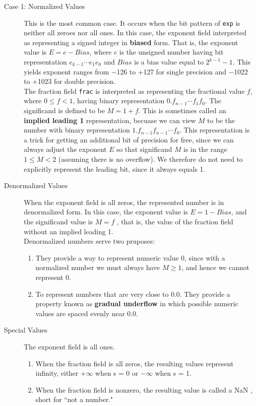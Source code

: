 \documentclass[11pt]{article}
\begin{document}
\begin{description}
\item[{Case 1: Normalized Values}] This is the most common case. It occurs when the bit pattern of \texttt{exp} is neither all zeroes nor all ones. In this case, the exponent field interpreted as representing a signed integer in \textbf{biased} form. That is, the exponent value is \(E = e-Bias\), where \(e\) is the unsigned number having bit representation \(e_{k-1}\cdots e_1 e_0\) and \(Bias\) is a bias value equal to \(2^{k-1} -1\). This yields exponent ranges from −126 to +127 for single precision and −1022 to +1023 for double precision.\\
The fraction field \texttt{frac} is interpreted as representing the fractional value \(f\), where \(0 \le f < 1\), having binary representation \(0.f_{n-1}\cdots f_1 f_0\). The significand is defined to be \(M = 1+f\). This is sometimes called an \textbf{implied leading 1} representation, becuase we can view \(M\) to be the number with binary representation \(1.f_{n-1} f_{n-1} \cdots f_0\). This representation is a trick for getting an additional bit of precision for free, since we can always adjust the exponent \(E\) so that significand \(M\) is in the range \(1 \le M < 2\) (assuming there is no overflow). We therefore do not need to explicitly represent the leading bit, since it always equals 1.\\
\item[{Denormalized Values}] When the exponent field is all zeros, the represented number is in denormalized form. In this case, the exponent value is \(E = 1 − Bias\), and the significand value is \(M = f\) , that is, the value of the fraction field without an implied leading 1.\\
Denormalized numbers serve two pruposes:\\
\begin{enumerate}
\item They provide a way to represent numeric value 0, since with a normalized number we must always have \(M ≥ 1\), and hence we cannot represent 0.\\
\item To represent numbers that are very close to 0.0. They provide a property known as \textbf{gradual underflow} in which possible numeric values are spaced evenly near 0.0.\\
\end{enumerate}
\item[{Special Values}] The exponent field is all ones.\\
\begin{enumerate}
\item When the fraction field is all zeros, the resulting values represent infinity, either \(+\infty\) when s = 0 or \(-\infty\) when s = 1.\\
\item When the fraction field is nonzero, the resulting value is called a NaN , short for “not a number."\\
\end{enumerate}
\end{description}
\end{document}

